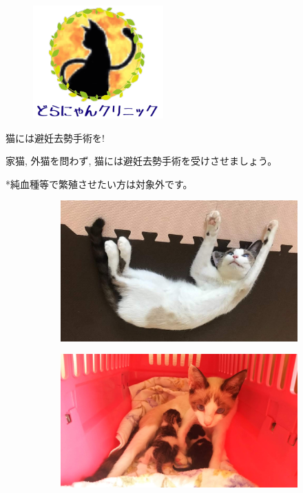 \documentclass{jsarticle}
\begin{document}
\vspace{-100pt}
\begin{figure}[htbp]
	\begin{center}
		\includegraphics[width=5cm]{Tra2.png}
	\end{center}
\end{figure}

\Huge
\vspace{-10pt}
  猫には避妊去勢手術を!

\Large
  家猫, 外猫を問わず, 猫には避妊去勢手術を受けさせましょう。

  *純血種等で繁殖させたい方は対象外です。


\vspace{15pt}

	\begin{figure}[htbp]
		\centering
		\begin{subfigure}{0.4\columnwidth}
			\centering
			\includegraphics[width=\columnwidth]{2.jpg}
		\end{subfigure}
		\begin{subfigure}{0.4\columnwidth}
			\centering
			\includegraphics[width=\columnwidth]{1.jpg}
		\end{subfigure}
	\end{figure}
\end{document}
